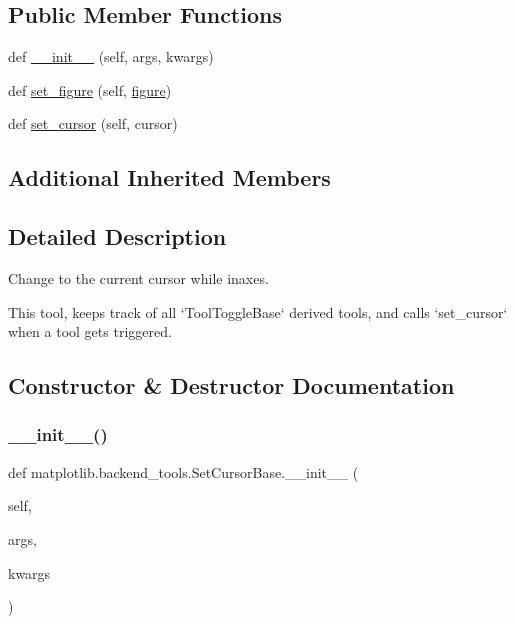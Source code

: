 \subsection*{Public Member Functions}
\begin{DoxyCompactItemize}
\item 
def \hyperlink{classmatplotlib_1_1backend__tools_1_1SetCursorBase_ab890ae9e3c3429f27a8ad86ff6fe110e}{\+\_\+\+\_\+init\+\_\+\+\_\+} (self, args, kwargs)
\item 
def \hyperlink{classmatplotlib_1_1backend__tools_1_1SetCursorBase_aca82e3ed1e9c5c9e62bffd3e4bdb6a8b}{set\+\_\+figure} (self, \hyperlink{classmatplotlib_1_1backend__tools_1_1ToolBase_af85e83d1db0787aa40d06837204651ee}{figure})
\item 
def \hyperlink{classmatplotlib_1_1backend__tools_1_1SetCursorBase_a8f12fe60eb6b9af48e178635471410fb}{set\+\_\+cursor} (self, cursor)
\end{DoxyCompactItemize}
\subsection*{Additional Inherited Members}


\subsection{Detailed Description}
\begin{DoxyVerb}Change to the current cursor while inaxes.

This tool, keeps track of all `ToolToggleBase` derived tools, and calls
`set_cursor` when a tool gets triggered.
\end{DoxyVerb}
 

\subsection{Constructor \& Destructor Documentation}
\mbox{\label{classmatplotlib_1_1backend__tools_1_1SetCursorBase_ab890ae9e3c3429f27a8ad86ff6fe110e}} 
\subsubsection{\texorpdfstring{\+\_\+\+\_\+init\+\_\+\+\_\+()}{\_\_init\_\_()}}
{\footnotesize\ttfamily def matplotlib.\+backend\+\_\+tools.\+Set\+Cursor\+Base.\+\_\+\+\_\+init\+\_\+\+\_\+ (\begin{DoxyParamCaption}\item[{}]{self,  }\item[{}]{args,  }\item[{}]{kwargs }\end{DoxyParamCaption})}




